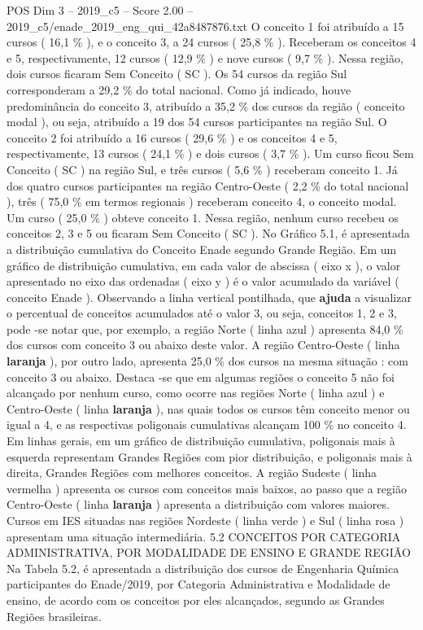 \begin{textsample}{POS Dim 3 – 2019\_c5 – Score 2.00 – 2019\_c5/enade\_2019\_eng\_qui\_42a8487876.txt}
O conceito 1 foi atribuído a 15 cursos ( 16,1 \% ), e o conceito 3, a 24 cursos ( 25,8 \% ).
Receberam os conceitos 4 e 5, respectivamente, 12 cursos ( 12,9 \% ) e nove cursos ( 9,7 \% ).
Nessa região, dois cursos ficaram Sem Conceito ( SC ).
Os 54 cursos da região Sul corresponderam a 29,2 \% do total nacional.
Como já indicado, houve predominância do conceito 3, atribuído a 35,2 \% dos cursos da região ( conceito modal ), ou seja, atribuído a 19 dos 54 cursos participantes na região Sul.
O conceito 2 foi atribuído a 16 cursos ( 29,6 \% ) e os conceitos 4 e 5, respectivamente, 13 cursos ( 24,1 \% ) e dois cursos ( 3,7 \% ).
Um curso ficou Sem Conceito ( SC ) na região Sul, e três cursos ( 5,6 \% ) receberam conceito 1.
Já dos quatro cursos participantes na região Centro-Oeste ( 2,2 \% do total nacional ), três ( 75,0 \% em termos regionais ) receberam conceito 4, o conceito modal.
Um curso ( 25,0 \% ) obteve conceito 1.
Nessa região, nenhum curso recebeu os conceitos 2, 3 e 5 ou ficaram Sem Conceito ( SC ).
No Gráfico 5.1, é apresentada a distribuição cumulativa do Conceito Enade segundo Grande Região.
Em um gráfico de distribuição cumulativa, em cada valor de abscissa ( eixo x ), o valor apresentado no eixo das ordenadas ( eixo y ) é o valor acumulado da variável ( conceito Enade ).
Observando a linha vertical pontilhada, que \textbf{ajuda} a visualizar o percentual de conceitos acumulados até o valor 3, ou seja, conceitos 1, 2 e 3, pode -se notar que, por exemplo, a região Norte ( linha azul ) apresenta 84,0 \% dos cursos com conceito 3 ou abaixo deste valor.
A região Centro-Oeste ( linha \textbf{laranja} ), por outro lado, apresenta 25,0 \% dos cursos na mesma situação : com conceito 3 ou abaixo.
Destaca -se que em algumas regiões o conceito 5 não foi alcançado por nenhum curso, como ocorre nas regiões Norte ( linha azul ) e Centro-Oeste ( linha \textbf{laranja} ), nas quais todos os cursos têm conceito menor ou igual a 4, e as respectivas poligonais cumulativas alcançam 100 \% no conceito 4.
Em linhas gerais, em um gráfico de distribuição cumulativa, poligonais mais à esquerda representam Grandes Regiões com pior distribuição, e poligonais mais à direita, Grandes Regiões com melhores conceitos.
A região Sudeste ( linha vermelha ) apresenta os cursos com conceitos mais baixos, ao passo que a região Centro-Oeste ( linha \textbf{laranja} ) apresenta a distribuição com valores maiores.
Cursos em IES situadas nas regiões Nordeste ( linha verde ) e Sul ( linha rosa ) apresentam uma situação intermediária. 5.2 CONCEITOS POR CATEGORIA ADMINISTRATIVA, POR MODALIDADE DE ENSINO E GRANDE REGIÃO Na Tabela 5.2, é apresentada a distribuição dos cursos de Engenharia Química participantes do Enade/2019, por Categoria Administrativa e Modalidade de ensino, de acordo com os conceitos por eles alcançados, segundo as Grandes Regiões brasileiras.

\end{textsample}
